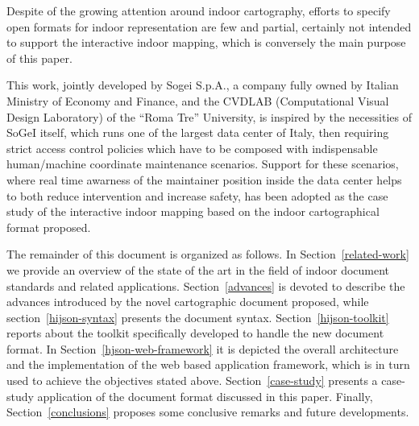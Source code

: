 Despite of the growing attention around indoor cartography, efforts to specify
open formats for indoor representation are few and partial, certainly not
intended to support the interactive indoor mapping, which is conversely the
main purpose of this paper.

This work, jointly developed by Sogei S.p.A., a company fully owned by
Italian  Ministry of Economy and Finance, and the CVDLAB (Computational
Visual Design Laboratory) of the ``Roma Tre'' University, is inspired by the
necessities of SoGeI itself, which runs one of the largest data center of
Italy, then requiring strict access control policies which have to be composed
with indispensable human/machine coordinate maintenance scenarios. Support for
these scenarios, where real time awarness of the maintainer position inside
the data center helps to both reduce intervention and increase safety, has
been adopted as the case study of the interactive indoor mapping based on the
indoor cartographical format proposed.


The remainder of this document is organized as follows. In
Section~\ref{related-work} we provide an overview of the state of the art in
the field of indoor document standards and related applications.
Section~\ref{advances} is devoted to describe the advances introduced by the
novel cartographic document proposed, while section~\ref{hijson-syntax}
presents the document syntax. Section~\ref{hijson-toolkit} reports about the
toolkit specifically developed to handle the new document format. In
Section~\ref{hjson-web-framework} it is depicted the overall architecture and
the implementation of the web based application framework, which is in turn
used to achieve the objectives stated above. Section~\ref{case-study} presents
a case-study application of the document format discussed in this paper.
Finally, Section~\ref{conclusions} proposes some conclusive remarks and future
developments.


